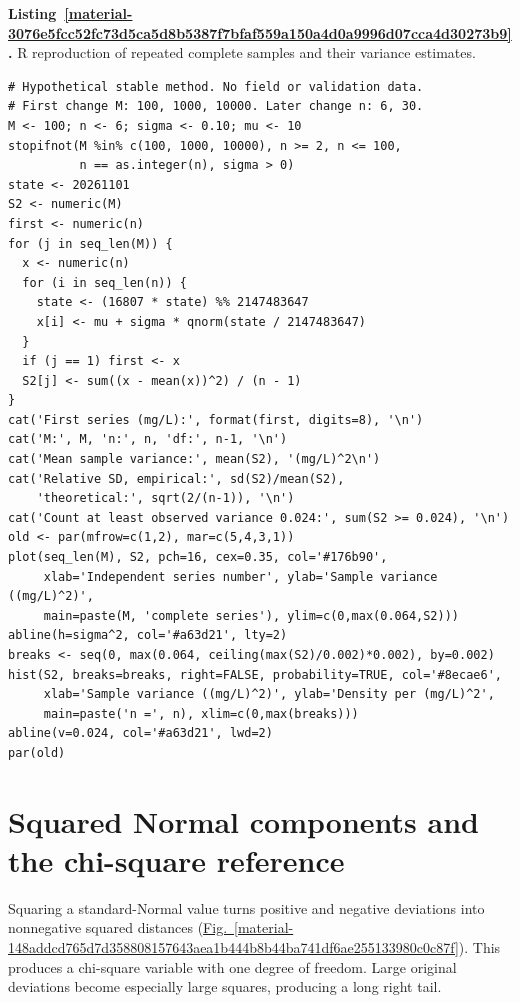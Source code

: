 \documentclass[11pt,a4paper]{article}
\newcounter{listing}
\begin{document}
\medskip

\par\medskip
{}
\label{material-3076e5fcc52fc73d5ca5d8b5387f7bfaf559a150a4d0a9996d07cca4d30273b9}
\noindent\textbf{Listing~\ref*{material-3076e5fcc52fc73d5ca5d8b5387f7bfaf559a150a4d0a9996d07cca4d30273b9}.} R reproduction of repeated complete samples and their variance estimates.\par\nopagebreak
\begin{Verbatim}[fontsize=\footnotesize,breaklines=true,breakanywhere=true]
# Hypothetical stable method. No field or validation data.
# First change M: 100, 1000, 10000. Later change n: 6, 30.
M <- 100; n <- 6; sigma <- 0.10; mu <- 10
stopifnot(M %in% c(100, 1000, 10000), n >= 2, n <= 100,
          n == as.integer(n), sigma > 0)
state <- 20261101
S2 <- numeric(M)
first <- numeric(n)
for (j in seq_len(M)) {
  x <- numeric(n)
  for (i in seq_len(n)) {
    state <- (16807 * state) %% 2147483647
    x[i] <- mu + sigma * qnorm(state / 2147483647)
  }
  if (j == 1) first <- x
  S2[j] <- sum((x - mean(x))^2) / (n - 1)
}
cat('First series (mg/L):', format(first, digits=8), '\n')
cat('M:', M, 'n:', n, 'df:', n-1, '\n')
cat('Mean sample variance:', mean(S2), '(mg/L)^2\n')
cat('Relative SD, empirical:', sd(S2)/mean(S2),
    'theoretical:', sqrt(2/(n-1)), '\n')
cat('Count at least observed variance 0.024:', sum(S2 >= 0.024), '\n')
old <- par(mfrow=c(1,2), mar=c(5,4,3,1))
plot(seq_len(M), S2, pch=16, cex=0.35, col='#176b90',
     xlab='Independent series number', ylab='Sample variance ((mg/L)^2)',
     main=paste(M, 'complete series'), ylim=c(0,max(0.064,S2)))
abline(h=sigma^2, col='#a63d21', lty=2)
breaks <- seq(0, max(0.064, ceiling(max(S2)/0.002)*0.002), by=0.002)
hist(S2, breaks=breaks, right=FALSE, probability=TRUE, col='#8ecae6',
     xlab='Sample variance ((mg/L)^2)', ylab='Density per (mg/L)^2',
     main=paste('n =', n), xlim=c(0,max(breaks)))
abline(v=0.024, col='#a63d21', lwd=2)
par(old)

\end{Verbatim}

\medskip

\clearpage
\section{Squared Normal components and the chi-square reference}
Squaring a standard-Normal value turns positive and negative deviations into nonnegative squared distances (\hyperref[material-148addcd765d7d358808157643aea1b444b8b44ba741df6ae255133980c0c87f]{Fig.~\ref*{material-148addcd765d7d358808157643aea1b444b8b44ba741df6ae255133980c0c87f}}). This produces a chi-square variable with one degree of freedom. Large original deviations become especially large squares, producing a long right tail.
\end{document}
